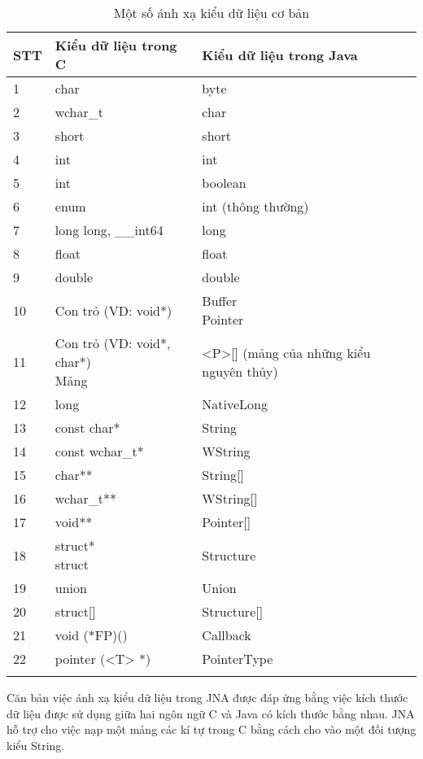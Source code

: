 \begin{longtable}{ | m{3cm} | m{5cm} | m{5cm} | }
	\hline
STT & Kiểu dữ liệu trong C & Kiểu dữ liệu trong Java\\
	\hline
	\hline
1 & char & byte\\
	\hline
2 & wchar\_t & char\\
	\hline
3 & short & short\\
	\hline
4 & int & int\\
	\hline
5 & int & boolean\\
	\hline
6 & enum & int (thông thường)\\
	\hline
7  & long long, \_\_int64 & long\\
	\hline
8 & float & float\\
	\hline
9 & double & double\\
	\hline
10 & Con trỏ (VD: void*) & \specialcell{Buffer \\ Pointer}\\
	\hline
11 & \specialcell{Con trỏ (VD: void*, char*) \\ Mảng} & <P>[] (mảng của những kiểu nguyên thủy)\\
	\hline
12 & long & NativeLong\\
	\hline
13 & const char* & String\\
	\hline
14 & const wchar\_t* & WString\\
	\hline
15 & char** & String[]\\
	\hline
16 & wchar\_t** & WString[]\\
	\hline
17 & void** & Pointer[]\\
	\hline
18 & \specialcell{struct* \\ struct} & Structure\\
	\hline
19 & union & Union\\
	\hline
20 & struct[] & Structure[]\\
	\hline
21 & void (*FP)() & Callback\\
	\hline
22 & pointer (<T> *) & PointerType\\
	\hline

\caption[Một số ánh xạ kiểu dữ liệu cơ bản]{Một số ánh xạ kiểu dữ liệu cơ bản}
\label{table:tblwapi_type_mapping}
\end{longtable}

Căn bản việc ánh xạ kiểu dữ liệu trong JNA được đáp ứng bằng việc kích thước dữ liệu được sử dụng giữa hai ngôn ngữ C và Java có kích thước bằng nhau. JNA hỗ trợ cho việc nạp một mảng các kí tự trong C bằng cách cho vào một đối tượng kiểu String.\\
 

